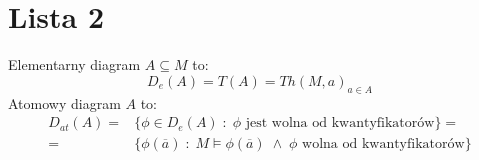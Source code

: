 \section{Lista 2}

Elementarny diagram $A\subseteq M$ to:
$$D_e(A)=T(A)=Th(M, a)_{a\in A}$$
Atomowy diagram $A$ to:
\begin{align*}
  D_{at}(A)=&\{\phi\in D_e(A)\;:\;\phi\text{ jest wolna od kwantyfikatorów}\}=\\ 
  =&\{\phi(\overline{a})\;:\;M\models\phi(\overline{a})\;\land\;\phi\text{ wolna od kwantyfikatorów}\} 
\end{align*}


